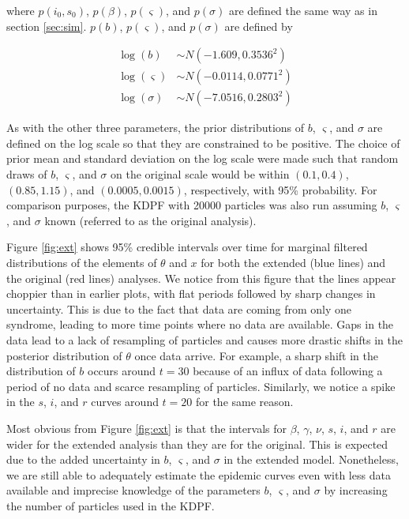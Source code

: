\documentclass{elsarticle}
\begin{document}
\noindent where $p(i_0,s_0)$, $p(\beta)$, $p(\varsigma)$, and $p(\sigma)$ are defined the same way as in section \ref{sec:sim}.  $p(b)$, $p(\varsigma)$, and $p(\sigma)$ are defined by

\begin{align*}
\log(b) &\sim  N(-1.609, 0.3536^2) \\
\log(\varsigma) &\sim N(-0.0114, 0.0771^2) \\
\log(\sigma) &\sim N(-7.0516, 0.2803^2)
\end{align*}

As with the other three parameters, the prior distributions of $b$, $\varsigma$, and $\sigma$ are defined on the log scale so that they are constrained to be positive.  The choice of prior mean and standard deviation on the log scale were made such that random draws of $b$, $\varsigma$, and $\sigma$ on the original scale would be within $(0.1, 0.4)$, $(0.85, 1.15)$, and $(0.0005, 0.0015)$, respectively, with 95\% probability.  For comparison purposes, the KDPF with 20000 particles was also run assuming $b$, $\varsigma$, and $\sigma$ known (referred to as the original analysis).

Figure \ref{fig:ext} shows 95\% credible intervals over time for marginal filtered distributions of the elements of $\theta$ and $x$ for both the extended (blue lines) and the original (red lines) analyses.  We notice from this figure that the lines appear choppier than in earlier plots, with flat periods followed by sharp changes in uncertainty.  This is due to the fact that data are coming from only one syndrome, leading to more time points where no data are available.  Gaps in the data lead to a lack of resampling of particles and causes more drastic shifts in the posterior distribution of $\theta$ once data arrive.  For example, a sharp shift in the distribution of $b$ occurs around $t = 30$ because of an influx of data following a period of no data and scarce resampling of particles.  Similarly, we notice a spike in the $s$, $i$, and $r$ curves around $t = 20$ for the same reason.

Most obvious from Figure \ref{fig:ext} is that the intervals for $\beta$, $\gamma$, $\nu$, $s$, $i$, and $r$ are wider for the extended analysis than they are for the original.  This is expected due to the added uncertainty in $b$, $\varsigma$, and $\sigma$ in the extended model.  Nonetheless, we are still able to adequately estimate the epidemic curves even with less data available and imprecise knowledge of the parameters $b$, $\varsigma$, and $\sigma$ by increasing the number of particles used in the KDPF.
\end{document}
